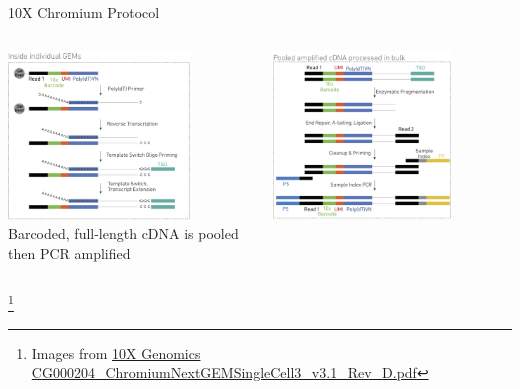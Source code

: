 \documentclass[aspectratio=169,11pt]{beamer}
\newcommand\blfootnote[1]{%
  \begingroup
  \renewcommand\thefootnote{}\footnote{#1}%
  \addtocounter{footnote}{-1}%
  \endgroup
}
\begin{document}
\begin{frame}{10X Chromium Protocol}

	\begin{columns}[T]
		\begin{column}{.45\textwidth}
			\includegraphics[width=0.75\textwidth]{figures/10xInsideGEM.png} 
			~\\[3mm]
			\small
			Barcoded, full-length cDNA is pooled then PCR amplified
		\end{column}
		\hfill
		\pause
		\begin{column}{.45\textwidth}
			\includegraphics[width=0.75\textwidth]{figures/10xPooled.png} 
		\end{column}
	\end{columns}
	\blfootnote{Images from \href{https://assets.ctfassets.net/an68im79xiti/1eX2FPdpeCgnCJtw4fj9Hx/7cb84edaa9eca04b607f9193162994de/CG000204\_ChromiumNextGEMSingleCell3\_v3.1\_Rev\_D.pdf}{10X Genomics CG000204\_ChromiumNextGEMSingleCell3\_v3.1\_Rev\_D.pdf}}
\end{frame}
\end{document}
